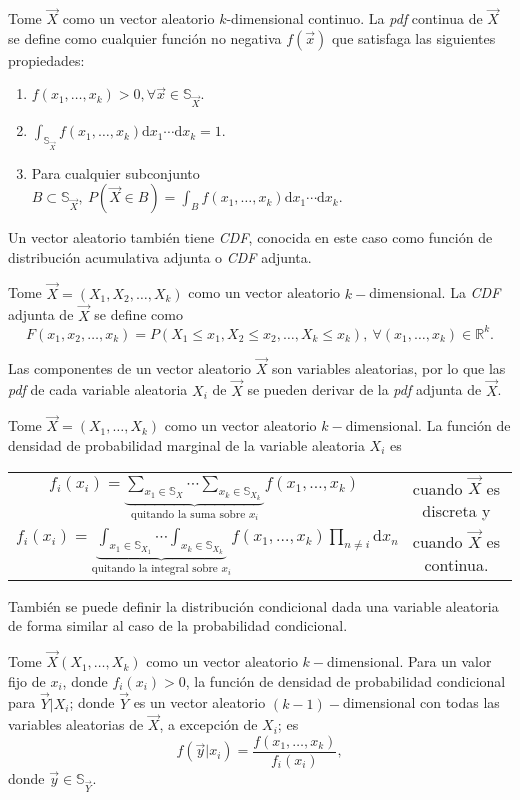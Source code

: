 	\begin{defi}
		Tome $\vec{X}$ como un vector aleatorio $k$-dimensional continuo. La \textit{pdf} continua de $\vec{X}$ se define como cualquier función no negativa $f(\vec{x})$ que satisfaga las siguientes propiedades:
		\begin{enumerate}
			\item $f(x_1,\dots,x_k)>0, \forall \vec{x}\in\mathbb{S}_{\vec{X}}.$
			\item $\int_{\mathbb{S}_{\vec{X}}} f(x_1,\dots,x_k)\mathrm{d}x_1\cdots\mathrm{d}x_k=1.$
			\item Para cualquier subconjunto $B\subset\mathbb{S}_{\vec{X}},\ P(\vec{X}\in B)=\int_{B}f(x_1,\dots,x_k)\mathrm{d}x_1\cdots\mathrm{d}x_k.$
		\end{enumerate}
	\end{defi}
	Un vector aleatorio también tiene \textit{CDF}, conocida en este caso como función de distribución acumulativa adjunta o \textit{CDF} adjunta.
	\begin{defi}
		Tome $\vec{X}=(X_1,X_2,\dots,X_k)$ como un vector aleatorio $k-$dimensional. La \textit{CDF} adjunta de $\vec{X}$ se define como
		$$F(x_1,x_2,\dots,x_k)=P(X_1\leq x_1, X_2\leq x_2,\dots, X_k\leq x_k), \ \forall (x_1,\dots,x_k)\in\mathbb{R}^k.$$
	\end{defi}
	Las componentes de un vector aleatorio $\vec{X}$ son variables aleatorias, por lo que las \textit{pdf} de cada variable aleatoria $X_i$ de $\vec{X}$ se pueden derivar de la \textit{pdf} adjunta de $\vec{X}$.
	\begin{defi}
		Tome $\vec{X}=(X_1,\dots,X_k)$ como un vector aleatorio $k-$dimensional. La función de densidad de probabilidad marginal de la variable aleatoria $X_i$ es
		
		\begin{center}
		\begin{tabular}{cc}
		$f_i(x_i)=\underbrace{\sum_{x_1\in\mathbb{S}_{X}}\cdots \sum_{x_k\in\mathbb{S}_{X_k}}}_{\text{quitando la suma sobre }x_i} f(x_1,\dots,x_k)$ & cuando $\vec{X}$ es discreta y\\
		$f_i(x_i)=\underbrace{\int_{x_1\in\mathbb{S}_{X_1}}\cdots \int_{x_k\in\mathbb{S}_{X_k}}}_{\text{quitando la integral sobre }x_i} f(x_1,\dots,x_k)\prod_{n\neq i}\mathrm{d}x_n$ & cuando $\vec{X}$ es continua.
		\end{tabular}
		\end{center}
	\end{defi}
	También se puede definir la distribución condicional dada una variable aleatoria de forma similar al caso de la probabilidad condicional.
	\begin{defi}
		Tome $\vec{X}(X_1,\dots,X_k)$ como un vector aleatorio $k-$dimensional. Para un valor fijo de $x_i$, donde $f_i(x_i)>0$, la función de densidad de probabilidad condicional para $\vec{Y}|X_i$; donde $\vec{Y}$ es un vector aleatorio $(k-1)-$dimensional con todas las variables aleatorias de $\vec{X}$, a excepción de $X_i$; es
		$$f(\vec{y}|x_i)=\frac{f(x_1,\dots,x_k)}{f_i(x_i)},$$
		donde $\vec{y}\in\mathbb{S}_{\vec{Y}}.$
	\end{defi}
